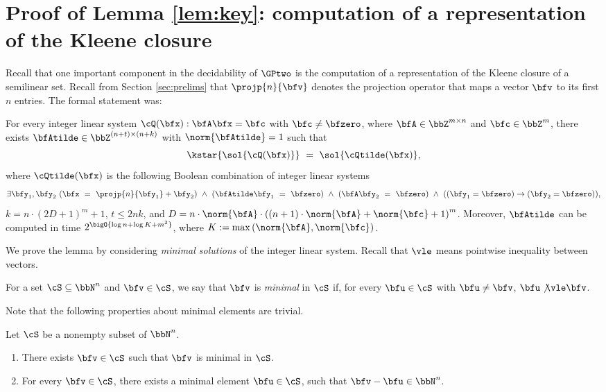 \section{Proof of Lemma \ref{lem:key}: computation of a representation of the Kleene closure}

Recall that one important component in the decidability of $\GPtwo$ is the computation of a representation of the Kleene closure of a semilinear set.
Recall from Section \ref{sec:prelims} that $\projp{n}{\bfv}$ denotes the projection operator that maps a vector $\bfv$ to its first $n$ entries.
The formal statement was:

\medskip

For every integer linear system $\cQ(\bfx): \bfA \bfx = \bfc$ with $\bfc \neq \bfzero$,
where $\bfA \in \bbZ^{m \times n}$ and $\bfc \in \bbZ^{m}$,
there exists $\bfAtilde \in \bbZ^{(n+t) \times (n+k)}$ with $\norm{\bfAtilde} = 1$
such that
\begin{equation*}
    \kstar{\sol{\cQ(\bfx)}}\ =\ \sol{\cQtilde(\bfx)},
\end{equation*}
where $\cQtilde(\bfx)$ is the following Boolean combination of integer linear systems
\begin{equation*}    
    \exists \bfy_1, \bfy_2\ 
    (\bfx\ =\ \projp{n}{\bfy_1} + \bfy_2)\ \land\ 
    (\bfAtilde\bfy_1\ =\ \bfzero)\ \land\ 
    (\bfA\bfy_2\ =\ \bfzero)\ \land\ 
    ((\bfy_1=\bfzero) \to (\bfy_2=\bfzero)),
\end{equation*}
$k = n\cdot(2D+1)^{m} + 1$,
$t \le 2nk$, and
$D = n \cdot \norm{\bfA} \cdot \left((n+1)\cdot \norm{\bfA} + \norm{\bfc} + 1\right)^{m}$.
Moreover, $\bfAtilde$ can be computed in time $2^\bigO{\log n + \log K + m^2}$,
where $K := \max\left(\norm{\bfA}, \norm{\bfc}\right)$.

\medskip

We prove the lemma by considering \emph{minimal solutions} of the integer linear system.
Recall that $\vle$ means pointwise inequality between vectors.
\begin{definition}
    For a set $\cS \subseteq \bbN^n$ and $\bfv \in \cS$,
    we say that $\bfv$ is \emph{minimal} in $\cS$
    if, for every $\bfu \in \cS$ with $\bfu \neq \bfv$,
     $\bfu \not\vle \bfv$.
\end{definition}

Note that the following properties about minimal elements are trivial.
\begin{lemma}\label{lem:min_property}
    Let $\cS$ be a nonempty subset of $\bbN^n$.
    \begin{enumerate}
        \item There exists $\bfv \in \cS$ such that $\bfv$ is minimal in $\cS$.
        \item For every $\bfv \in \cS$, there exists a minimal element $\bfu \in \cS$,
            such that $\bfv - \bfu \in \bbN^n$.
    \end{enumerate}
\end{lemma}

